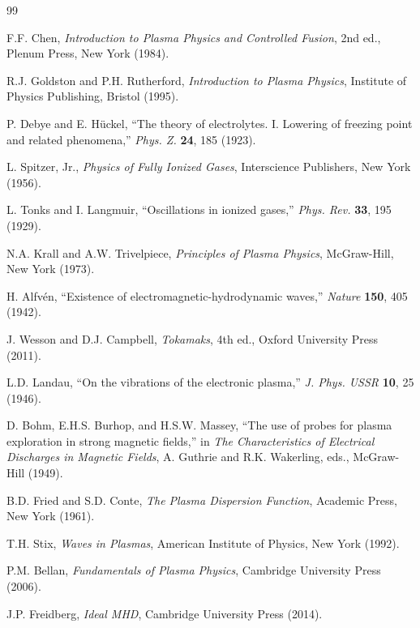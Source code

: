 \documentclass[11pt,a4paper]{article}
\begin{document}
\begin{thebibliography}{99}

F.F. Chen, \textit{Introduction to Plasma Physics and Controlled Fusion}, 2nd ed., Plenum Press, New York (1984).

R.J. Goldston and P.H. Rutherford, \textit{Introduction to Plasma Physics}, Institute of Physics Publishing, Bristol (1995).

P. Debye and E. Hückel, ``The theory of electrolytes. I. Lowering of freezing point and related phenomena,'' \textit{Phys. Z.} \textbf{24}, 185 (1923).

L. Spitzer, Jr., \textit{Physics of Fully Ionized Gases}, Interscience Publishers, New York (1956).

L. Tonks and I. Langmuir, ``Oscillations in ionized gases,'' \textit{Phys. Rev.} \textbf{33}, 195 (1929).

N.A. Krall and A.W. Trivelpiece, \textit{Principles of Plasma Physics}, McGraw-Hill, New York (1973).

H. Alfvén, ``Existence of electromagnetic-hydrodynamic waves,'' \textit{Nature} \textbf{150}, 405 (1942).

J. Wesson and D.J. Campbell, \textit{Tokamaks}, 4th ed., Oxford University Press (2011).

L.D. Landau, ``On the vibrations of the electronic plasma,'' \textit{J. Phys. USSR} \textbf{10}, 25 (1946).

D. Bohm, E.H.S. Burhop, and H.S.W. Massey, ``The use of probes for plasma exploration in strong magnetic fields,'' in \textit{The Characteristics of Electrical Discharges in Magnetic Fields}, A. Guthrie and R.K. Wakerling, eds., McGraw-Hill (1949).

B.D. Fried and S.D. Conte, \textit{The Plasma Dispersion Function}, Academic Press, New York (1961).

T.H. Stix, \textit{Waves in Plasmas}, American Institute of Physics, New York (1992).

P.M. Bellan, \textit{Fundamentals of Plasma Physics}, Cambridge University Press (2006).

J.P. Freidberg, \textit{Ideal MHD}, Cambridge University Press (2014).


\end{thebibliography}
\end{document}
